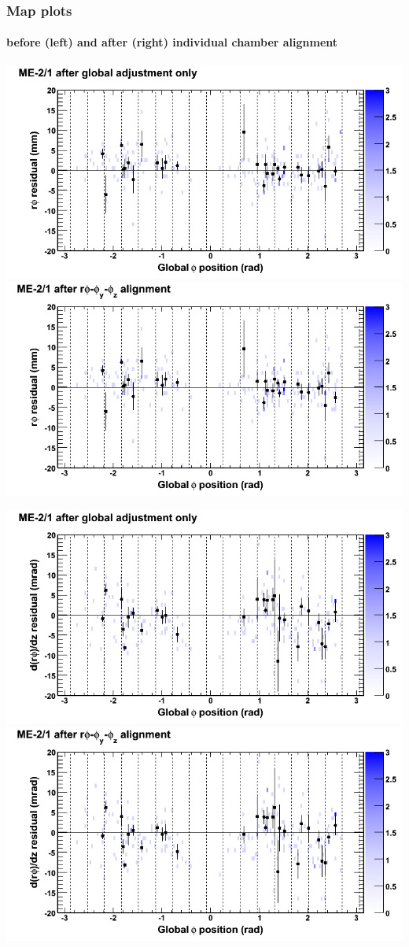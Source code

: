 \documentclass[compress]{beamer}
\begin{document}
\begin{frame}
\frametitle{Map plots}
\framesubtitle{before (left) and after (right) individual chamber alignment}
\includegraphics[width=0.5\linewidth]{ringmapplots_3dof/before_CSCvsphi_mem21_x.png} \includegraphics[width=0.5\linewidth]{ringmapplots_3dof/after_CSCvsphi_mem21_x.png}

\includegraphics[width=0.5\linewidth]{ringmapplots_3dof/before_CSCvsphi_mem21_dxdz.png} \includegraphics[width=0.5\linewidth]{ringmapplots_3dof/after_CSCvsphi_mem21_dxdz.png}
\end{frame}
\end{document}

